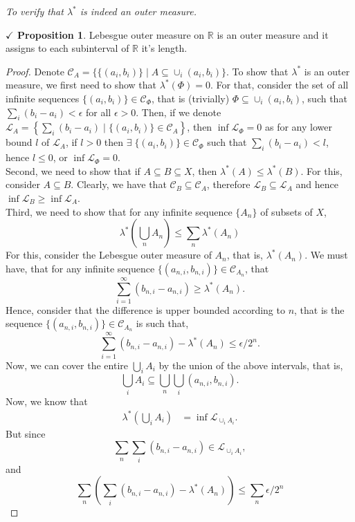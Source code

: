\documentclass{article}
\theoremstyle{definition}
\theoremstyle{remark}
\theoremstyle{definition}
\theoremstyle{definition}
\newtheorem{proposition}{$\checkmark$ Proposition}
\theoremstyle{definition}
\newcommand{\union}{\cup}
\newcommand{\bunion}{\bigcup}
\newcommand{\where}{\;\vert\;}
\newcommand{\R}{\mathbb{R}}
\newcommand{\alg}[1]{\mathscr{#1}}
\newcommand{\lom}[1]{\lambda^*\left (#1\right )}
\newcommand{\set}[1]{\mathscr{#1}}
\begin{document}
\emph{To verify that $ \lambda^* $ is indeed an outer measure.}
\begin{proposition}
	\label{P-9}
	Lebesgue outer measure on $ \R $ is an outer measure and it assigns to each subinterval of $ \R $ it's length.
\end{proposition}
\begin{proof}
	Denote $ \set{C}_A = \{\{(a_i,b_i)\}\where A \subseteq \union_i(a_i,b_i)\}$. To show that $ \lambda^* $ is an outer measure, we first need to show that $ \lom{\Phi} = 0 $. For that, consider the set of all infinite sequences $ \{(a_i,b_i)\} \in \alg{C}_\Phi$, that is (trivially) $\Phi\subseteq  \union_{i}(a_i,b_i) $, such that $ \sum_{i}(b_i - a_i) <\epsilon $ for all $ \epsilon>0 $. Then, if we denote $ \alg{L}_A = \left \{\sum_{i} (b_i - a_i)\where \{(a_i,b_i)\}\in \alg{C}_A\right \} $, then $ \inf\alg{L}_\Phi = 0$ as for any lower bound $ l $ of $ \alg{L}_A $, if $ l>0 $ then $ \exists \; \{(a_i,b_i)\}\in  \set{C}_\Phi$ such that $ \sum_i(b_i - a_i) < l $, hence $ l\le 0 $, or $ \inf\set{L}_\Phi = 0$. \\
	Second, we need to show that if $ A\subseteq B \subseteq X $, then $ \lom{A}\le \lom{B} $. For this, consider $ A\subseteq B $. Clearly, we have that $ \set{C}_B \subseteq \set{C}_A $, therefore $ \set{L}_B \subseteq \set{L}_A $ and hence $ \inf \set{L}_B \ge \inf \set{L}_A $.\\
	Third, we need to show that for any infinite sequence $ \{A_n\} $ of subsets of $ X $,
	\[\lom{\bunion_n A_n}\le \sum_{n}\lom{A_n}\]
	For this, consider the Lebesgue outer measure of $ A_n $, that is, $ \lom{A_n} $. We must have, that for any infinite sequence $ \{(a_{n,i}, b_{n,i})\} \in \set{C}_{A_n} $, that 
	\[\sum_{i=1}^\infty (b_{n,i} - a_{n,i}) \ge \lom{A_n}.\]
	Hence, consider that the difference is upper bounded according to $ n $, that is the sequence $ \{(a_{n,i},b_{n,i})\}\in \set{C}_{A_n} $ is such that,
	\[\sum_{i=1}^\infty (b_{n,i} - a_{n,i}) - \lom{A_n} \le \epsilon/2^n.\]
	 Now, we can cover the entire $ \bunion_i A_i $ by the union of the above intervals, that is, 
	 \[\bunion_i A_i \subseteq \bunion_n \bunion_i (a_{n,i},b_{n,i}).\]
	 Now, we know that
	 \begin{equation*}
	 	\begin{split}
	 		\lom{\bunion_iA_i} &= \inf\set{L}_{\union_iA_i}.
	 	\end{split}
	 \end{equation*}
	 But since
	 \[\sum_{n}\sum_i (b_{n,i}- a_{n,i}) \in \set{L}_{\union_i A_i},\]
	 and
	 \[\sum_n \left (\sum_i(b_{n,i}-a_{n,i}) - \lom{A_n}\right ) \le \sum_n \epsilon/2^n\]

\end{proof}
\end{document}

